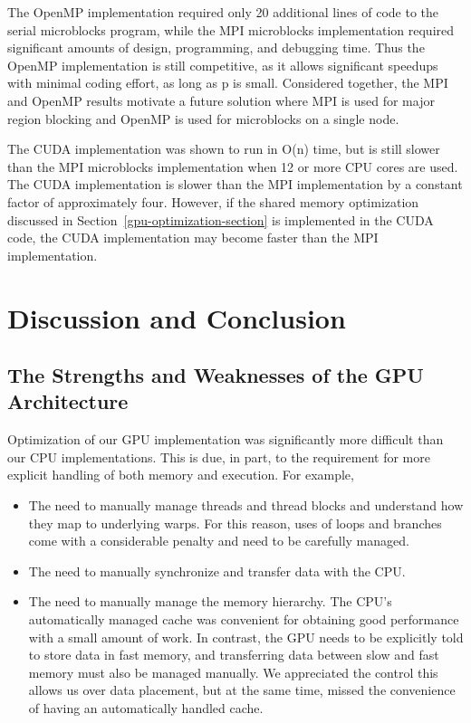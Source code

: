 \documentclass[11pt]{article} %
\begin{document}
The OpenMP implementation required only 20 additional lines of code to the serial microblocks program, while the MPI microblocks implementation required significant amounts of design, programming, and debugging time. Thus the OpenMP implementation is still competitive, as it allows significant speedups with minimal coding effort, as long as p is small. Considered together, the MPI and OpenMP results motivate a future solution where MPI is used for major region blocking and OpenMP is used for microblocks on a single node.

The CUDA implementation was shown to run in O(n) time, but is still slower than the MPI microblocks implementation when 12 or more CPU cores are used. The CUDA implementation is slower than the MPI implementation by a constant factor of approximately four. However, if the shared memory optimization discussed in Section~\ref{gpu-optimization-section} is implemented in the CUDA code, the CUDA implementation may become faster than the MPI implementation.

\section{Discussion and Conclusion}
\label{conclusion-section}

\subsection{The Strengths and Weaknesses of the GPU Architecture}
Optimization of our GPU implementation was significantly more difficult
than our CPU implementations. This is due, in part, to the requirement
for more explicit handling of both memory and execution. For example,
\begin{itemize}
\item The need to manually manage threads and thread blocks and understand
how they map to underlying warps. For this reason, uses of loops and
branches come with a considerable penalty and need to be carefully
managed.
\item The need to manually synchronize and transfer data with the CPU.
\item The need to manually manage the memory hierarchy. The CPU's automatically
managed cache was convenient for obtaining good performance with a
small amount of work. In contrast, the GPU needs to be explicitly
told to store data in fast memory, and transferring data between slow
and fast memory must also be managed manually. We appreciated the
control this allows us over data placement, but at the same time,
missed the convenience of having an automatically handled cache.\end{itemize}
\end{document}
